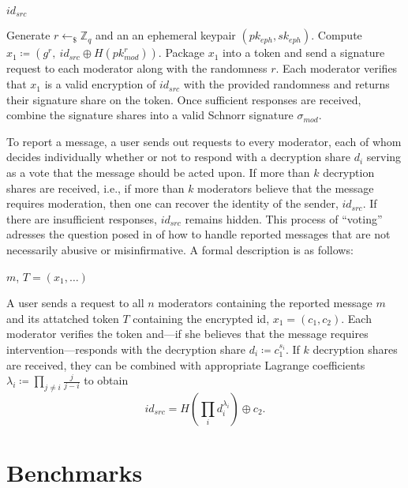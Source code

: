 \documentclass[conference]{IEEEtran}
\newcommand{\function}[3]{
	\Function {#1} {#2}
	#3
	\EndFunction
	\smallskip
}
\newcommand{\ceq}{\coloneqq}
\newcommand{\Z}{\mathbb Z}
\begin{document}
\smallskip

\begin{algorithmic}[1]
	\function{CreateToken}{$id_{src}$}{
		\State Generate $r \gets_\$ \Z_q$ and an an ephemeral keypair $(pk_{eph}, sk_{eph})$.
		\State Compute $x_1 \ceq \left(g^r, \ id_{src} \oplus H(pk_{mod}^r)\right)$.
		\State Package $x_1$ into a token and send a signature request to each moderator along with the randomness $r$.
		\State Each moderator verifies that $x_1$ is a valid encryption of $id_{src}$ with the provided randomness and returns their signature share on the token.
		\State Once sufficient responses are received, combine the signature shares into a valid Schnorr signature $\sigma_{mod}$.
	}
\end{algorithmic}

\smallskip

To report a message, a user sends out requests to every moderator, each of whom decides individually whether or not to respond with a decryption share $d_i$ serving as a vote that the message should be acted upon.
If more than $k$ decryption shares are received, i.e., if more than $k$ moderators believe that the message requires moderation, then one can recover the identity of the sender, $id_{src}$. If there are insufficient responses, $id_{src}$ remains hidden.
This process of ``voting'' adresses the question posed in \cite{hecate} of how to handle reported messages that are not necessarily abusive or misinfirmative. A formal description is as follows:

\smallskip

\begin{algorithmic}[1]
	\function{HandleReport}{$m$, $T = (x_1, \ldots )$}{
	\State A user sends a request to all $n$ moderators containing the reported message $m$ and its attatched token $T$ containing the encrypted id, $x_1 = (c_1, c_2)$.
	\State Each moderator verifies the token and---if she believes that the message requires intervention---responds with the decryption share $d_i \ceq c_1^{s_i}$.
	\State If $k$ decryption shares are received, they can be combined with appropriate Lagrange coefficients $\lambda_i \ceq \prod_{j \neq i} \frac{j}{j - i}$ to obtain
	\begin{equation}
		id_{src}
		= H \left(\prod_i d_i^{\lambda_i}\right) \oplus c_2.
	\end{equation}
	}
\end{algorithmic}

\section{Benchmarks}
\end{document}
